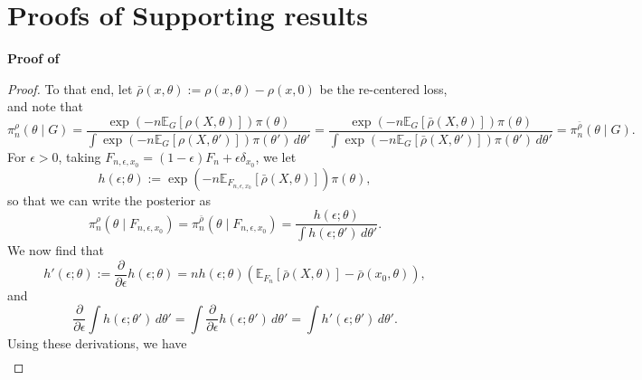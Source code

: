 \documentclass[11pt, oneside]{amsart}
\theoremstyle{definition}   %
\newcommand{\E}{\mathbb{E}}
\newcommand{\loss}{\rho}
\newcommand{\closs}{\bar{\loss}}
\newcommand{\mposterior}{\pi_n^{\loss}}
\newcommand{\centeredmposterior}{\pi_n^{\closs}}
\begin{document}
\section{Proofs of Supporting results}

\noindent \textbf{Proof of }

\begin{proof}
    To that end, let \( \closs ( x,\theta) := \loss(x,\theta) - \loss(x,0)\) be the re-centered loss, and note that 
    \begin{equation*}
        \mposterior(\theta \mid G) =
        \frac{\exp \left ( -n \E_{G} [\loss (X,\theta)] \right) \pi(\theta)}{\int \exp \left ( -n \E_{G} [\loss (X,\theta')] \right) \pi(\theta') \, d\theta'} =
        \frac{\exp \left ( -n \E_{G} [\closs (X, \theta)] \right) \pi(\theta)}{\int \exp \left ( -n \E_{G} [\closs (X,\theta')] \right) \pi(\theta') \, d\theta'} = 
        \centeredmposterior(\theta \mid G).
    \end{equation*}
    For \( \epsilon > 0\), taking \( F_{n,\epsilon,x_0} = (1 - \epsilon) F_n + \epsilon \delta_{x_0} \), we let
    \begin{equation*}
        h(\epsilon; \theta) := \exp \left ( -n \E_{F_{n,\epsilon,x_0}} [\closs (X, \theta)] \right) \pi(\theta),
    \end{equation*}
    so that we can write the posterior as
    \begin{equation*}
        \mposterior(\theta \mid F_{n,\epsilon,x_0}) = \centeredmposterior(\theta \mid F_{n,\epsilon,x_0}) = \frac{h(\epsilon; \theta)}{\int h(\epsilon; \theta') \, d\theta'}.
    \end{equation*}
    We now find that
    \begin{equation*}
        h'(\epsilon; \theta) := \frac{\partial}{\partial \epsilon} h(\epsilon ; \theta) = n h(\epsilon; \theta) \left( \E_{F_n} [ \closs(X, \theta) ] - \closs(x_0, \theta) \right),
    \end{equation*}
    and
    \begin{equation*}
        \frac{\partial}{\partial \epsilon} \int h(\epsilon; \theta') \, d\theta' = \int \frac{\partial}{\partial \epsilon} h(\epsilon; \theta') \, d\theta' = \int h'(\epsilon; \theta') \, d\theta'.
    \end{equation*}
    Using these derivations, we have
    \begin{equation*}
    \begin{split}

\end{split}
\end{equation*}
\end{proof}
\end{document}
